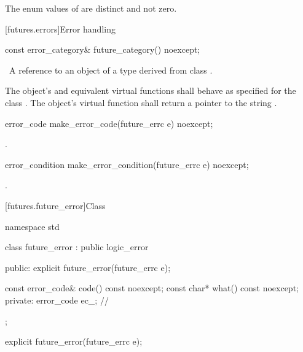 \pnum
The enum values of  are distinct and not zero.

[futures.errors]{Error handling}

%
\begin{itemdecl}
const error_category& future_category() noexcept;
\end{itemdecl}

\begin{itemdescr}
\pnum
\returns\ A reference to an object of a type derived from class .

\pnum
The object's  and equivalent virtual functions shall
behave as specified for the class . The object's 
virtual function shall return a pointer to the string .
\end{itemdescr}

%
\begin{itemdecl}
error_code make_error_code(future_errc e) noexcept;
\end{itemdecl}

\begin{itemdescr}
\pnum
\returns {}.
\end{itemdescr}

%
\begin{itemdecl}
error_condition make_error_condition(future_errc e) noexcept;
\end{itemdecl}

\begin{itemdescr}
\pnum
\returns {}.
\end{itemdescr}

[futures.future_error]{Class }

%
\begin{codeblock}
namespace std {
  class future_error : public logic_error {
  public:
    explicit future_error(future_errc e);

    const error_code& code() const noexcept;
    const char*       what() const noexcept;
  private:
    error_code ec_;  // \expos
  };
}
\end{codeblock}

%
\begin{itemdecl}
explicit future_error(future_errc e);
\end{itemdecl}

